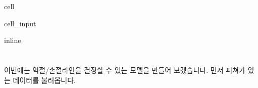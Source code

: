 \documentclass[letterpaper,10pt,english]{jupyterBook}
\begin{document}
\begin{sphinxuseclass}{cell}\begin{sphinxVerbatimInput}

\begin{sphinxuseclass}{cell_input}
\begin{sphinxVerbatim}[commandchars=\\\{\}]
   
   
 inline
   
   
 
 
 
\end{sphinxVerbatim}

\end{sphinxuseclass}\end{sphinxVerbatimInput}

\end{sphinxuseclass}

\chapter{}
\label{\detokenize{chapter6/6.2.1_Profit_Loss_Sell:id1}}\label{\detokenize{chapter6/6.2.1_Profit_Loss_Sell::doc}}
\sphinxAtStartPar
 이번에는 익절/손절라인을 결정할 수 있는 모델을 만들어 보겠습니다. 먼저 피쳐가 있는 데이터를 불러옵니다.
\end{document}
